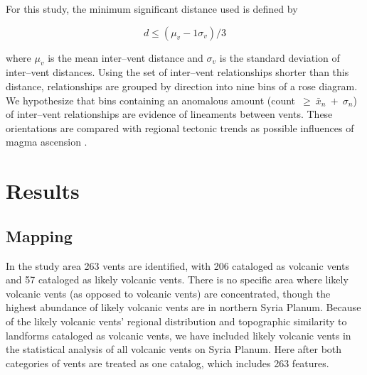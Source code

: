 \documentclass[preprint,review,authoryear,12pt]{elsarticle}
\begin{document}
For this study, the minimum significant distance used is defined by \citet{Cebria2011} \begin{linenomath*}\begin{equation}
d \le (\mu_v - 1\sigma_v) / 3 \label{eq5}
\end{equation}\end{linenomath*} where $\mu_v$ is the mean inter--vent distance and $\sigma_v$ is the standard deviation of inter--vent distances. Using the set of inter--vent relationships shorter than this distance, relationships are grouped by direction into nine bins of a rose diagram. We hypothesize that bins containing an anomalous amount (count~$\ge~\bar{x}_n~+~\sigma_n$) of inter--vent relationships are evidence of lineaments between vents. These orientations are compared with regional tectonic trends as possible influences of magma ascension \citep{Bleacher2009,Cebria2011}.

\section{Results}

\subsection{Mapping}

In the study area 263 vents are identified, with 206 cataloged as volcanic vents and 57 cataloged as likely volcanic vents. There is no specific area where likely volcanic vents (as opposed to volcanic vents) are concentrated, though the highest abundance of likely volcanic vents are in northern Syria Planum. Because of the likely volcanic vents' regional distribution and topographic similarity to landforms cataloged as volcanic vents, we have included likely volcanic vents in the statistical analysis of all volcanic vents on Syria Planum. Here after both categories of vents are treated as one catalog, which includes 263 features.
\end{document}
